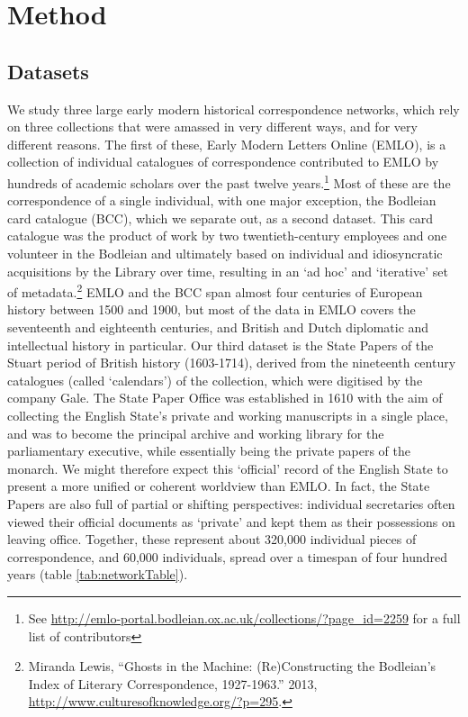 \documentclass[]{article}
\begin{document}
\hypertarget{method}{%
\section{Method}\label{method}}

\hypertarget{datasets}{%
\subsection{Datasets}\label{datasets}}

We study three large early modern historical correspondence networks, which rely on three collections that were amassed in very different ways, and for very different reasons. The first of these, Early Modern Letters Online (EMLO), is a collection of individual catalogues of correspondence contributed to EMLO by hundreds of academic scholars over the past twelve years.\footnote{See \url{http://emlo-portal.bodleian.ox.ac.uk/collections/?page_id=2259} for a full list of contributors} Most of these are the correspondence of a single individual, with one major exception, the Bodleian card catalogue (BCC), which we separate out, as a second dataset. This card catalogue was the product of work by two twentieth-century employees and one volunteer in the Bodleian and ultimately based on individual and idiosyncratic acquisitions by the Library over time, resulting in an `ad hoc' and `iterative' set of metadata.\footnote{Miranda Lewis, ``Ghosts in the Machine: (Re)Constructing the Bodleian's Index of Literary Correspondence, 1927-1963.'' 2013, \url{http://www.culturesofknowledge.org/?p=295}.} EMLO and the BCC span almost four centuries of European history between 1500 and 1900, but most of the data in EMLO covers the seventeenth and eighteenth centuries, and British and Dutch diplomatic and intellectual history in particular. Our third dataset is the State Papers of the Stuart period of British history (1603-1714), derived from the nineteenth century catalogues (called `calendars') of the collection, which were digitised by the company Gale. The State Paper Office was established in 1610 with the aim of collecting the English State's private and working manuscripts in a single place, and was to become the principal archive and working library for the parliamentary executive, while essentially being the private papers of the monarch. We might therefore expect this `official' record of the English State to present a more unified or coherent worldview than EMLO. In fact, the State Papers are also full of partial or shifting perspectives: individual secretaries often viewed their official documents as `private' and kept them as their possessions on leaving office. Together, these represent about 320,000 individual pieces of correspondence, and 60,000 individuals, spread over a timespan of four hundred years (table \ref{tab:networkTable}).
\end{document}
